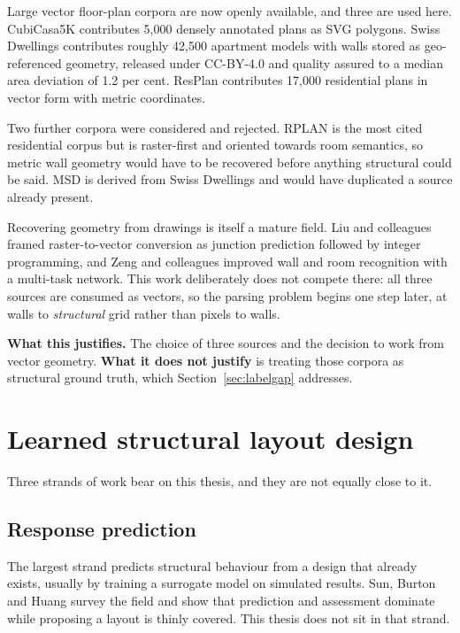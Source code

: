 Large vector floor-plan corpora are now openly available, and three are
used here. CubiCasa5K \citep{kalervo2019cubicasa} contributes 5,000
densely annotated plans as SVG polygons. Swiss Dwellings
\citep{standfest2022swiss} contributes roughly 42,500 apartment models with
walls stored as geo-referenced geometry, released under CC-BY-4.0 and
quality assured to a median area deviation of 1.2 per cent. ResPlan
\citep{abouagour2025resplan} contributes 17,000 residential plans in
vector form with metric coordinates.

Two further corpora were considered and rejected. RPLAN
\citep{wu2019rplan} is the most cited residential corpus but is
raster-first and oriented towards room semantics, so metric wall geometry
would have to be recovered before anything structural could be said. MSD
\citep{vanengelenburg2024msd} is derived from Swiss Dwellings and would
have duplicated a source already present.

Recovering geometry from drawings is itself a mature field. Liu and
colleagues \citep{liu2017raster2vector} framed raster-to-vector conversion
as junction prediction followed by integer programming, and Zeng and
colleagues \citep{zeng2019deepfloorplan} improved wall and room
recognition with a multi-task network. This work deliberately does not
compete there: all three sources are consumed as vectors, so the parsing
problem begins one step later, at walls to \emph{structural} grid rather
than pixels to walls.

\textbf{What this justifies.} The choice of three sources and the decision
to work from vector geometry. \textbf{What it does not justify} is
treating those corpora as structural ground truth, which
Section~\ref{sec:labelgap} addresses.

\section{Learned structural layout design}

Three strands of work bear on this thesis, and they are not equally close
to it.

\subsection{Response prediction}

The largest strand predicts structural behaviour from a design that
already exists, usually by training a surrogate model on simulated
results. Sun, Burton and Huang \citep{sun2021mlreview} survey the field
and show that prediction and assessment dominate while proposing a layout
is thinly covered. This thesis does not sit in that strand.

